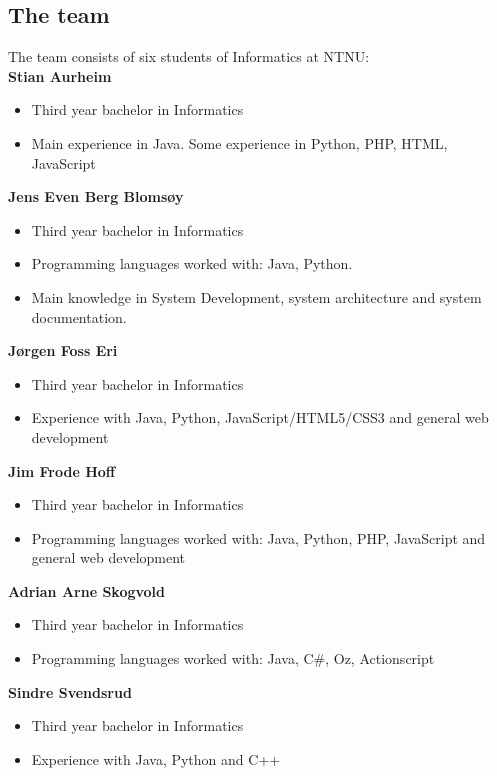 \subsection{The team}
The team consists of six students of Informatics at NTNU:\\
\textbf{Stian Aurheim}
\begin{itemize} \setlength{\itemsep}{0cm}\setlength{\parskip}{0cm}
	\item Third year bachelor in Informatics
	\item Main experience in Java. Some experience in Python, PHP, HTML, 
		  JavaScript 
\end{itemize}
\textbf{Jens Even Berg Blomsøy}
\begin{itemize} \setlength{\itemsep}{0cm}\setlength{\parskip}{0cm}
	\item Third year bachelor in Informatics
	\item Programming languages worked with: Java, Python.
	\item Main knowledge in System Development, system architecture and 
		  system documentation.
\end{itemize}
\textbf{Jørgen Foss Eri}
\begin{itemize} \setlength{\itemsep}{0cm}\setlength{\parskip}{0cm}
	\item Third year bachelor in Informatics
	\item Experience with Java, Python, JavaScript/HTML5/CSS3 and general web development
\end{itemize}
\textbf{Jim Frode Hoff}
\begin{itemize} \setlength{\itemsep}{0cm}\setlength{\parskip}{0cm}
	\item Third year bachelor in Informatics
	\item Programming languages worked with: Java, Python, PHP, JavaScript
		  and general web development
\end{itemize}
\textbf{Adrian Arne Skogvold}
\begin{itemize} \setlength{\itemsep}{0cm}\setlength{\parskip}{0cm}
	\item Third year bachelor in Informatics
	\item Programming languages worked with: Java, C\#, Oz, Actionscript
\end{itemize}
\textbf{Sindre Svendsrud}
\begin{itemize} \setlength{\itemsep}{0cm}\setlength{\parskip}{0cm}
	\item Third year bachelor in Informatics 
	\item Experience with Java, Python and C++
\end{itemize}

